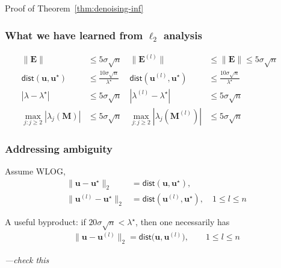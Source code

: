 \documentclass[compress,
mathserif,wide,%
]{beamer}
\begin{document}
\begin{frame}[plain]
\vfill
\centering
\large Proof of Theorem~\ref{thm:denoising-inf}
\vfill
\end{frame}

\begin{frame}
	\frametitle{What we have learned from $\ell_2$ analysis}
	\begin{subequations}
\begin{align*}
  \|\bm{E} \|  &\leq 5\sigma \sqrt{n}    & \|\bm{E}^{(l)} \| &\leq \|\bm{E} \| \leq 5\sigma \sqrt{n}  && \\
  \mathsf{dist}( \bm{u} , \bm{u}^{\star} )  &\leq \frac{10\sigma\sqrt{n}}{\lambda^{\star}}  ~~
 & \mathsf{dist}( \bm{u}^{(l)} , \bm{u}^{\star} )  &\leq \frac{10\sigma\sqrt{n}}{\lambda^{\star}} && \\
	| \lambda - \lambda^{\star} |  &\leq 5\sigma \sqrt{n} & | \lambda^{(l)} - \lambda^{\star} |  &\leq 5\sigma \sqrt{n} &&\\
	\max_{j: j\geq 2} | \lambda_j(\bm{M})   |  &\leq 5\sigma \sqrt{n} & \max_{j: j\geq 2}| \lambda_j(\bm{M}^{(l)}) |  &\leq 5\sigma \sqrt{n}
\end{align*}
%
\end{subequations}
\end{frame}

\begin{frame}
	\frametitle{Addressing ambiguity}
	Assume WLOG, 
 \begin{subequations}
\begin{align*}
	\|\bm{u} - \bm{u}^{\star}\|_2 &= \mathsf{dist}( \bm{u}, \bm{u}^{\star} ), \quad \\
	\big\| \bm{u}^{(l)} - \bm{u}^{\star} \big\|_2 &= \mathsf{dist}( \bm{u}^{(l)}, \bm{u}^{\star} ) , \quad 1 \leq l \leq n
\end{align*}
\end{subequations}


A useful byproduct: if ${20\sigma{\sqrt{n}}} < \lambda^{\star}$, then one necessarily has
%
\begin{align*}
	\big\| \bm{u} -  \bm{u}^{(l)} \big\|_2 = \mathsf{dist}\big( \bm{u}, \bm{u}^{(l)}\big), \qquad 1 \leq l \leq n	
\end{align*}

{\hfill \em \footnotesize ---check this}
\end{frame}
\end{document}
